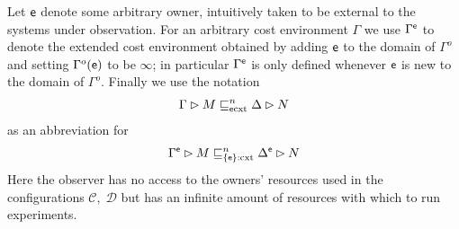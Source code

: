 \documentclass{LMCS}
\newcommand{\with}{\mathbin \rhd}
\newcommand{\ownO}{ {\ownfnt O}}
\newcommand{\sobs}{{\ownfnt e}}
\newcommand{\Ecxtequiv}[1]{\mathrel{\sqsubseteq_{\rm \sobs cxt}^{#1}}}
\newcommand{\Obscxtequiv}[2]{\mathrel{\sqsubseteq_{#1:\rm cxt}^{#2}}}
\newcommand{\Gammaobs}{\Gamma^{\sobs}}
\newcommand{\Deltaobs}{\Delta^{\sobs}}
\newcommand{\setof}[2]{\{ \, #1 \, \mid \, #2 \, \}}\newcommand{\sset}[1]{\{ {#1}  \}  }
\newcommand{\calC}{\mathcal{C}}
\newcommand{\calD}{\mathcal{D}}
\newcommand{\leaveout}[1]{ }
\begin{document}
Let $\sobs$ denote some arbitrary owner, intuitively taken to be external to the 
systems under observation.
For an arbitrary cost environment $\Gamma$ we use $\Gammaobs$ to denote the 
extended cost environment obtained by adding $\sobs$ to the domain of $\Gamma^o$ 
and setting $\Gamma^o(\sobs)$ to be $\infty$; in particular $\Gammaobs$ is only defined
whenever $\sobs$ is new to the domain of $\Gamma^o$.   Finally we use the notation
\begin{align*}
  \Gamma \with M  \Ecxtequiv{n} \Delta \with N
\end{align*}
as an abbreviation for
\begin{align*}
    \Gammaobs \with M   \Obscxtequiv{\sset{\sobs}}{n} \Deltaobs \with N
\end{align*}
Here the observer has no access to the owners' resources used in the configurations $\calC,\;\calD$ but has
an infinite amount of resources with which to run experiments. 
\leaveout{
The importance of these external owners is emphasised
by the following results:
\begin{prop}\label{prop:own1}
\qquad
\begin{enumerate}[\em(a)]
\item

  Let $\ownO_1 = \ownO \cup \sset{\sobs_1}$, where $\ownO_2 = \ownO \cup \sset{\sobs_1,\sobs_2}$ and both
  $\sobs_i$ are fresh. 
Then $\calC  \Obscxtequiv{\ownO_1}{n} \calD$ if and only if $\calC \Obscxtequiv{\ownO_2}{n}  \calD$.

\item

Suppose $\ownO_1 = \ownO_2 \cup \sset{\ownfnt o}\;  \ownO_2 = \ownO \cup \sset{o}$, where 
again $\sobs$ is fresh, and 
suppose further that
$\Gamma^o(\ownfnt o) = \Delta^o(\ownfnt o) = \infty$. Then 
$\Gamma \with M  \Obscxtequiv{\ownO_1}{n} \Delta \with N$ if and only if
$\Gamma \with M  \Ecxtequiv{n} \Delta \with N$.
\end{enumerate}
\end{prop}
\begin{proof}
  These statements are difficult to prove directly from the definitions, but are straightforward
consequences of the full-abstraction result, Theorem~\ref{thm:fa}. 
\end{proof}
The first result states informally that there is no need to have two external owners, while the
second means that in the presence of an external owner there is no need for the observer to have
access to any other owner with indefinite funds. These, taken together with Proposition~\ref{prop:increase},
means that there is limited use in considering observers with access to owners other than a single 
external one. For this reason we are mainly interested in the behavioural preorders 
$\setof{\Ecxtequiv{n}}{ n \geq 0}$. 
}
\end{document}
